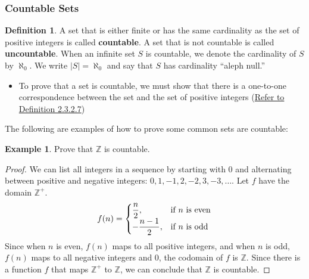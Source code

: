 \documentclass[article, 11pt]{article}
\theoremstyle{definition}
\newtheorem{example}{Example}[subsubsection]
\newtheorem{definition}{Definition}[subsubsection]
\newcommand{\df}{\displaystyle\frac} %
\newcommand{\ints}{\mathbb{Z}}
\begin{document}
    \subsubsection{Countable Sets}
    \begin{definition}
        A set that is either finite or has the same cardinality as the set of positive integers is called \textbf{countable}. A set that is not countable is called \textbf{uncountable}. When an infinite set $S$ is countable, we denote the cardinality of $S$ by $\aleph_0$. We write $|S| = \aleph_0$ and say that $S$ has cardinality ``aleph null.''
        \begin{itemize}
            \item To prove that a set is countable, we must show that there is a one-to-one correspondence between the set and the set of positive integers (\hyperref[def:one-to-one-correspondence]{Refer to Definition 2.3.2.7})
        \end{itemize}
    \end{definition}
    The following are examples of how to prove some common sets are countable:
    \begin{example}
        Prove that $\ints$ is countable. \\
        \begin{proof}
            We can list all integers in a sequence by starting with 0 and alternating between positive and negative integers: $0, 1, -1, 2, -2, 3, -3, \dots$. Let $f$ have the domain $\ints^+$.
            \begin{equation*}
                f(n) = \begin{cases}
                            \df{n}{2}, & \text{if } n \text{ is even} \cr
                            -\df{n-1}{2}, & \text{if } n \text{ is odd}
                        \end{cases}
            \end{equation*}
            Since when $n$ is even, $f(n)$ maps to all positive integers, and when $n$ is odd, $f(n)$ maps to all negative integers and 0, the codomain of $f$ is $\ints$. Since there is a function $f$ that maps $\ints^+$ to $\ints$, we can conclude that $\ints$ is countable.
        \end{proof}
    \end{example}
\end{document}
